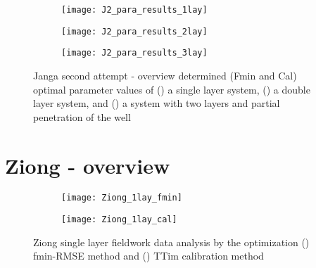 \begin{figure}[h!]
	\centering
	\begin{subfigure}[b]{\linewidth}
		\centering\texttt{[image: J2\_para\_results\_1lay]}
		\captionsetup{justification=centering}		
		\caption{\label{fig:J2_para_results_1lay}}
		\end{subfigure}\vfill
	\begin{subfigure}[b]{\linewidth}
		\centering\texttt{[image: J2\_para\_results\_2lay]}
		\captionsetup{justification=centering}		
		\caption{\label{fig:J2_para_results_2lay}}
		\end{subfigure}
	\begin{subfigure}[b]{\linewidth}
		\centering\texttt{[image: J2\_para\_results\_3lay]}
		\captionsetup{justification=centering}		
		\caption{\label{fig:J2_para_results_3lay}}
		\end{subfigure}		
	\captionsetup{justification=centering}	
	\caption{Janga second attempt - overview determined (Fmin and Cal) optimal parameter values of () a single layer system, () a double layer system, and () a system with two layers and partial penetration of the well} 
	\label{fig:J2_para_results}
\end{figure} 


\clearpage\section{Ziong - overview}
\label{sec:Ziong_overview}

\begin{figure}[h!]
	\centering
	\begin{subfigure}[b]{0.65\linewidth}
		\centering\texttt{[image: Ziong\_1lay\_fmin]}
		\captionsetup{justification=centering}		
		\caption{\label{fig:Ziong_1lay_fmin}}
		\end{subfigure}\vfill
	\begin{subfigure}[b]{0.65\linewidth}
		\centering\texttt{[image: Ziong\_1lay\_cal]}
		\captionsetup{justification=centering}		
		\caption{\label{fig:Ziong_1lay_cal}}
		\end{subfigure}
	\captionsetup{justification=centering}	
	\caption{Ziong single layer fieldwork data analysis by the optimization () fmin-RMSE method and () TTim calibration method} 
	\label{fig:Ziong_1lay_analysis}
\end{figure} 

